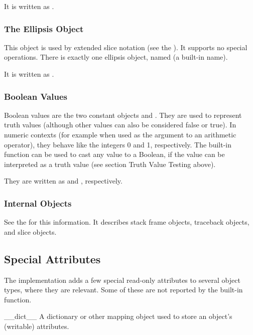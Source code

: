 It is written as .


\subsubsection{The Ellipsis Object \label{bltin-ellipsis-object}}

This object is used by extended slice notation (see the
).  It supports no
special operations.  There is exactly one ellipsis object, named
 (a built-in name).

It is written as .

\subsubsection{Boolean Values}

Boolean values are the two constant objects  and
.  They are used to represent truth values (although other
values can also be considered false or true).  In numeric contexts
(for example when used as the argument to an arithmetic operator),
they behave like the integers 0 and 1, respectively.  The built-in
function  can be used to cast any value to a Boolean,
if the value can be interpreted as a truth value (see section Truth
Value Testing above).

They are written as  and , respectively.


\subsubsection{Internal Objects \label{typesinternal}}

See the  for this
information.  It describes stack frame objects, traceback objects, and
slice objects.


\subsection{Special Attributes \label{specialattrs}}

The implementation adds a few special read-only attributes to several
object types, where they are relevant.  Some of these are not reported
by the  built-in function.

\begin{memberdesc}[object]{__dict__}
A dictionary or other mapping object used to store an
object's (writable) attributes.
\end{memberdesc}

